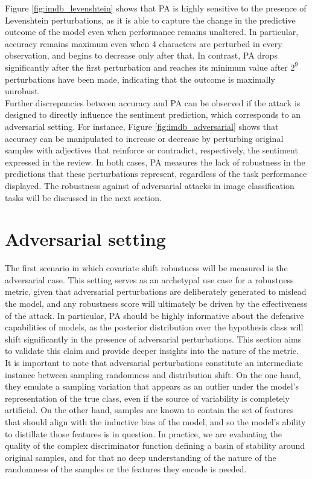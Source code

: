 Figure \ref{fig:imdb_levenshtein} shows that PA is highly sensitive to the
presence of Levenshtein perturbations, as it is able to capture the
change in the predictive outcome of the model even when performance remains 
unaltered. In particular, accuracy remains maximum even when 4 characters
are perturbed in every observation, and begins to decrease only after that. In contrast,
PA drops significantly after the first perturbation and reaches its minimum value
after $2^9$ perturbations have been made, indicating that the outcome is maximally
unrobust. \\

Further discrepancies between accuracy and PA can be observed if the 
attack is designed to directly influence the sentiment prediction, which corresponds
to an adversarial setting. For instance, Figure \ref{fig:imdb_adversarial} shows that accuracy can be 
manipulated to increase or decrease by perturbing original samples with
adjectives that reinforce or contradict, respectively, 
the sentiment expressed in the review. In both cases, PA measures the lack of robustness in the
predictions that these perturbations represent, regardless of the task
performance displayed. The robustness against of adversarial attacks in
image classification tasks will be discussed in the next section. \\

\section{Adversarial setting}\label{sec:results_adversarial}

The first scenario in which covariate shift robustness will be measured is the
adversarial case. This setting serves as an archetypal use case for a robustness 
metric, given that adversarial perturbations are deliberately generated to mislead the
model, and any robustness score will ultimately be driven by the effectiveness of the 
attack. In particular, PA should be highly informative about the defensive capabilities 
of models, as the posterior distribution over the hypothesis class will shift 
significantly in the presence of adversarial perturbations. This section aims to validate 
this claim and provide deeper insights into the nature of the metric. \\

It is important to note that adversarial perturbations constitute an
intermediate instance between sampling randomness and distribution shift. 
On the one hand, they emulate a sampling variation that appears 
as an outlier under the model's representation of the true class, even if
the source of variability is completely artificial. On the other
hand, samples are known to contain the set of features that should 
align with the inductive bias of the model, and so the model's ability to 
distillate those features is in question. In practice, we are evaluating the 
quality of the complex discriminator function defining a basin of stability
around original samples, and for that no deep understanding of the nature of 
the randomness of the samples or the features they encode is needed.\\

